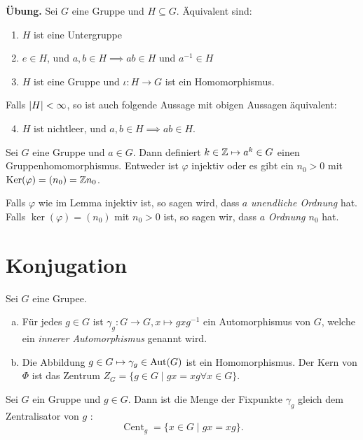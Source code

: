 \textbf{Übung.} Sei $G$ eine Gruppe und $H \subseteq G$. Äquivalent sind:
\begin{enumerate}[1)]
	\item $H$ ist eine Untergruppe
	\item $e \in H$, und $a,b \in H \implies ab \in H$ und $a^{-1} \in H$ 
	\item $H$ ist eine Gruppe und $\iota: H \to G$ ist ein Homomorphismus.
\end{enumerate}
Falls $\abs{H} < \infty$, so ist auch folgende Aussage mit obigen Aussagen äquivalent:
\begin{enumerate}[1)]
	\setcounter{enumi}{3}
	\item $H$ ist nichtleer, und $a,b \in H \implies ab \in H$.
\end{enumerate}



\begin{lemma}
	Sei $G$ eine Gruppe und $a \in G$. Dann definiert $k \in \mathbb{Z} \mapsto a^{k} \in G$ einen Gruppenhomomorphismus.
	Entweder ist $\varphi$ injektiv oder es gibt ein $n_0 > 0$ mit $\operatorname{Ker}(\varphi) = (n_0) = \mathbb{Z} n_0$.
\end{lemma}

\begin{definition}
	Falls $\varphi$ wie im Lemma injektiv ist, so sagen wird, dass $a$ \emph{unendliche Ordnung} hat.
	Falls $\ker(\varphi) = (n_0)$ mit $n_0 > 0$ ist, so sagen wir, dass $a$ \emph{Ordnung $n_0$} hat.
\end{definition}



\section{Konjugation}

\begin{lemma}
	Sei $G$ eine Grupee.
	\begin{enumerate}[a)]
		\item Für jedes $g \in G$ ist $\gamma_{g}: G \to G, x \mapsto g x g^{-1}$ ein Automorphismus von $G$, welche ein \emph{innerer Automorphismus} genannt wird.
		\item Die Abbildung $g \in G \mapsto \gamma_{g} \in \operatorname{Aut}(G)$ ist ein Homomorphismus.
			Der Kern von $\Phi$ ist das Zentrum $Z_{G} = \{g \in G \mid gx = xg \forall x \in G\} $.
	\end{enumerate}
\end{lemma}


\begin{definition}
	Sei $G$ ein Gruppe und $g \in G$. Dann ist die Menge der Fixpunkte $\gamma_{g}$ gleich dem Zentralisator von $g$ :
	\[
		\operatorname{Cent}_{g} = \{x \in G \mid gx = xg\} 
	.\] 
\end{definition}

